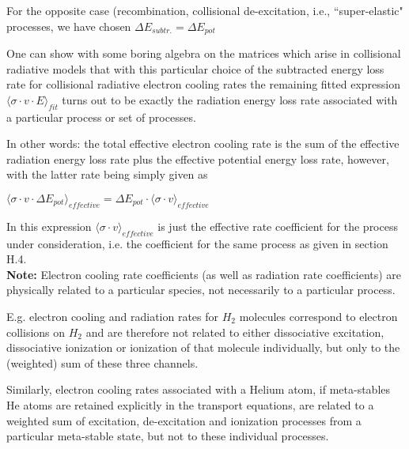 \documentclass[12pt,dvipdfmx]{article}
\begin{document}
For the opposite case (recombination, collisional de-excitation, i.e., ``super-elastic"
processes, we have chosen $\Delta E_{subtr.} = \Delta E_{pot}$

One can show with some boring algebra on the matrices which arise in collisional radiative
models that
with this particular choice of the subtracted energy loss rate for collisional radiative
electron cooling rates
the remaining fitted expression $\langle\sigma \cdot v \cdot E \rangle_{fit}$
turns out to be exactly the radiation energy loss rate
associated with a particular process or set of processes.

In other words: the total effective electron cooling rate
is the sum of the effective
radiation energy loss rate
plus the effective potential energy loss rate, however, with the latter rate being simply
given as

$\langle\sigma \cdot v \cdot \Delta E_{pot} \rangle_{effective} = \Delta E_{pot}
\cdot \langle\sigma \cdot v \rangle_{effective}$

In this expression $\langle\sigma \cdot v \rangle_{effective}$
is just the effective rate coefficient
for the process under consideration, i.e. the coefficient for the same process as given
in section H.4.
\\
\textbf{Note:}
Electron cooling rate coefficients (as well as radiation rate coefficients) are physically
related to a particular species, not necessarily to a particular process.

E.g. electron cooling and radiation rates for $H_2$ molecules correspond to electron collisions
on $H_2$ and are therefore not related to either dissociative excitation, dissociative ionization or
ionization of that molecule individually, but only to the (weighted) sum of these three channels.

Similarly, electron cooling rates associated with a Helium atom, if meta-stables He atoms are retained explicitly
in the transport equations, are related to a weighted sum of excitation, de-excitation and ionization processes
from a particular meta-stable state, but not to these individual processes.
\newpage
\end{document}
